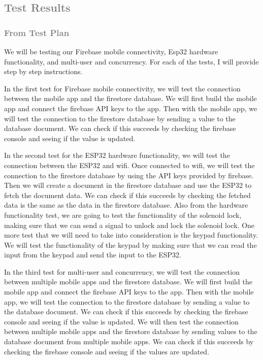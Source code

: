 \subsection{\textcolor{gray}{Test Results}}

\subsubsection{\textcolor{gray}{From Test Plan}}
We will be testing our Firebase mobile connectivity, Esp32 hardware functionality, and multi-user and concurrency. For each of the tests, I will provide step by step instructions.

In the first test for Firebase mobile connectivity, we will test the connection between the mobile app and the firestore database. We will first build the mobile app and connect the firebase API keys to the app. Then with the mobile app, we will test the connection to the firestore database by sending a value to the database document. We can check if this succeeds by checking the firebase console and seeing if the value is updated.

In the second test for the ESP32 hardware functionality, we will test the connection between the ESP32 and wifi. Once connected to wifi, we will test the connection to the firestore database by using the API keys provided by firebase. Then we will create a document in the firestore database and use the ESP32 to fetch the document data. We can check if this succeeds by checking the fetched data is the same as the data in the firestore database. Also from the hardware functionality test, we are going to test the functionality of the solenoid lock, making sure that we can send a signal to unlock and lock the solenoid lock. One more test that we will need to take into consideration is the keypad functionality. We will test the functionality of the keypad by making sure that we can read the input from the keypad and send the input to the ESP32.

In the third test for multi-user and concurrency, we will test the connection between multiple mobile apps and the firestore database. We will first build the mobile app and connect the firebase API keys to the app. Then with the mobile app, we will test the connection to the firestore database by sending a value to the database document. We can check if this succeeds by checking the firebase console and seeing if the value is updated. We will then test the connection between multiple mobile apps and the firestore database by sending values to the database document from multiple mobile apps. We can check if this succeeds by checking the firebase console and seeing if the values are updated.

